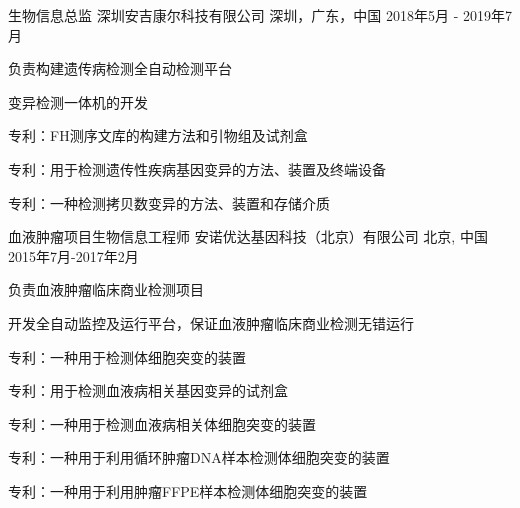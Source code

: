 

\begin{cventries}

  \cventry
    {生物信息总监} %
    {深圳安吉康尔科技有限公司} %
    {深圳，广东，中国} %
    {2018年5月 - 2019年7月} %
    {
      \begin{cvitems} %
        \item {负责构建遗传病检测全自动检测平台}
        \item {变异检测一体机的开发}
        \item {专利：FH测序文库的构建方法和引物组及试剂盒 }
        \item {专利：用于检测遗传性疾病基因变异的方法、装置及终端设备}
        \item {专利：一种检测拷贝数变异的方法、装置和存储介质 }
      \end{cvitems}
    }



  \cventry
    {血液肿瘤项目生物信息工程师} %
    {安诺优达基因科技（北京）有限公司} %
    {北京, 中国} %
    {2015年7月-2017年2月} %
    {
      \begin{cvitems} %
        \item {负责血液肿瘤临床商业检测项目}
        \item {开发全自动监控及运行平台，保证血液肿瘤临床商业检测无错运行}
        \item {专利：一种用于检测体细胞突变的装置}
        \item {专利：用于检测血液病相关基因变异的试剂盒}
        \item {专利：一种用于检测血液病相关体细胞突变的装置}
        \item {专利：一种用于利用循环肿瘤DNA样本检测体细胞突变的装置}
        \item {专利：一种用于利用肿瘤FFPE样本检测体细胞突变的装置 }
      \end{cvitems}
    }



\end{cventries}